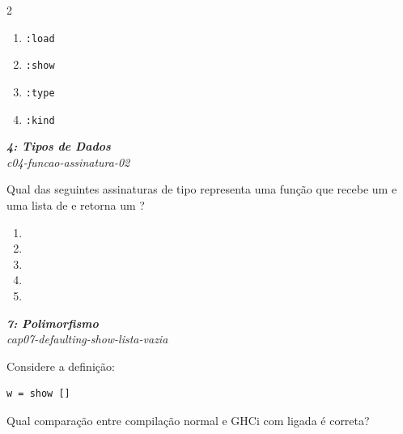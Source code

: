 \documentclass[a4paper,10pt,brazil]{article}
\begin{document}
\begin{multicols}{2}
\begin{enumerate}
  \item \texttt{:load}

  \item \texttt{:show}

  \item \texttt{:type}

  \item \texttt{:kind}


\end{enumerate}

\begin{flushright}
  \footnotesize
  \textit{\textbf{4: Tipos de Dados}}\\
  \textit{c04-funcao-assinatura-02}\\

\end{flushright}
Qual das seguintes assinaturas de tipo representa uma função que recebe um  e uma lista de  e retorna um ?

\begin{enumerate}
  \item {}

  \item {}

  \item {}

  \item {}

  \item {}


\end{enumerate}

\begin{flushright}
  \footnotesize
  \textit{\textbf{7: Polimorfismo}}\\
  \textit{cap07-defaulting-show-lista-vazia}\\

\end{flushright}
Considere a definição:

\begin{verbatim}
w = show []
\end{verbatim}

Qual comparação entre compilação normal e GHCi com  ligada é correta?


\end{multicols}
\end{document}
